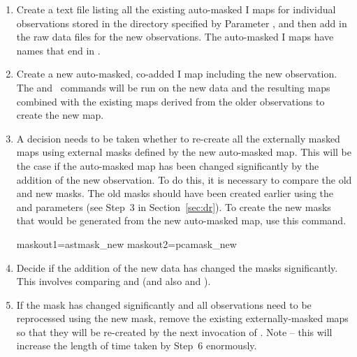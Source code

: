 \begin{enumerate}

\item Create a text file listing all the existing auto-masked I maps
  for individual observations stored in the directory specified by
  Parameter , and then add in the raw data files for the new
  observations. The auto-masked I maps have names that end in
  .

\begin{terminalv}
\end{terminalv}


\item Create a new auto-masked, co-added I map including the new
  observation. The  and \makemap\ commands
  will be run on the new
  data and the resulting maps combined with the existing maps derived
  from the older observations to create the new map.

\begin{terminalv}
\end{terminalv}


\item A decision needs to be taken whether to re-create all the
  externally masked maps using external masks defined by the new
  auto-masked map. This will be the case if the auto-masked map has
  been changed significantly by the addition of the new
  observation. To do this, it is necessary to compare the old and new
  masks. The old masks should have been created earlier using the
   and  parameters (see Step~3 in Section~\ref{sec:dr}). To
  create the new masks that would be generated from the new
  auto-masked map, use this command.

\begin{terminalv}
maskout1=astmask_new           maskout2=pcamask_new
\end{terminalv}


\item Decide if the addition of the new data has changed the masks
  significantly. This involves comparing  and
   (and also  and
  ).


\item If the mask has changed significantly and all observations need
  to be reprocessed using the new mask, remove the existing
  externally-masked maps so that they will be re-created by the next
  invocation of .  Note -- this will increase the length of time
  taken by Step~6 enormously.


\end{enumerate}
